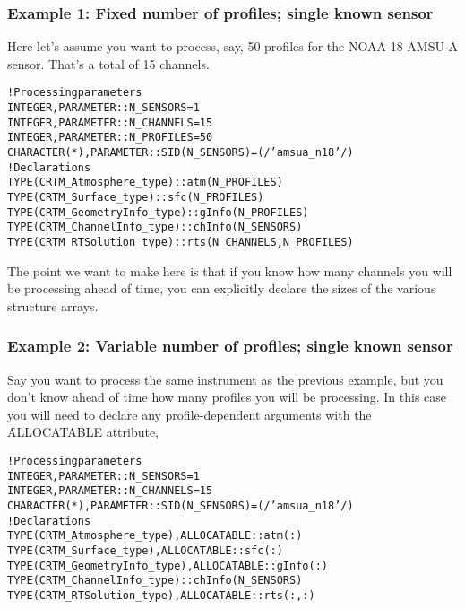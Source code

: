 \subsubsection{Example 1: Fixed number of profiles; single known sensor}
\label{sec:declare_ex_fpsks}
Here let's assume you want to process, say, 50 profiles for the NOAA-18 AMSU-A sensor. That's a total of 15 channels. 
\begin{alltt}
  ! Processing parameters
  INTEGER, PARAMETER :: N_SENSORS  =  1
  INTEGER, PARAMETER :: N_CHANNELS = 15
  INTEGER, PARAMETER :: N_PROFILES = 50
  CHARACTER(*), PARAMETER :: SID(N_SENSORS) = (/'amsua_n18'/)
  ! Declarations
  TYPE(CRTM_Atmosphere_type)   :: atm(N_PROFILES)
  TYPE(CRTM_Surface_type)      :: sfc(N_PROFILES)
  TYPE(CRTM_GeometryInfo_type) :: gInfo(N_PROFILES)  
  TYPE(CRTM_ChannelInfo_type)  :: chInfo(N_SENSORS)  
  TYPE(CRTM_RTSolution_type)   :: rts(N_CHANNELS,N_PROFILES)\end{alltt}

The point we want to make here is that if you know how many channels you will be processing ahead of time, you can explicitly declare the sizes of the various structure arrays.

\subsubsection{Example 2: Variable number of profiles; single known sensor}
\label{sec:declare_ex_vpsks}
Say you want to process the same instrument as the previous example, but you don't know ahead of time how many profiles you will be processing. In this case you will need to declare any profile-dependent arguments with the \f{ALLOCATABLE} attribute,
\begin{alltt}
  ! Processing parameters
  INTEGER, PARAMETER :: N_SENSORS  =  1
  INTEGER, PARAMETER :: N_CHANNELS = 15
  CHARACTER(*), PARAMETER :: SID(N_SENSORS) = (/'amsua_n18'/)
  ! Declarations
  TYPE(CRTM_Atmosphere_type)  , ALLOCATABLE :: atm(:)
  TYPE(CRTM_Surface_type)     , ALLOCATABLE :: sfc(:)
  TYPE(CRTM_GeometryInfo_type), ALLOCATABLE :: gInfo(:)  
  TYPE(CRTM_ChannelInfo_type)               :: chInfo(N_SENSORS)
  TYPE(CRTM_RTSolution_type)  , ALLOCATABLE :: rts(:,:)\end{alltt}


